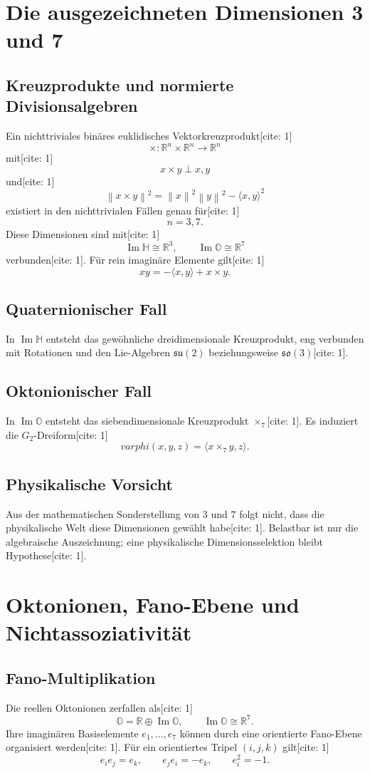 \documentclass[11pt,a4paper]{article}
\newcommand{\OO}{\mathbb{O}}
\newcommand{\HH}{\mathbb{H}}
\newcommand{\RR}{\mathbb{R}}
\newcommand{\norm}[1]{\left\lVert #1 \right\rVert}
\begin{document}
\section{Die ausgezeichneten Dimensionen 3 und 7}
\subsection{Kreuzprodukte und normierte Divisionsalgebren}
Ein nichttriviales binäres euklidisches Vektorkreuzprodukt[cite: 1]
\[
\times:\RR^n\times\RR^n\to\RR^n
\]
mit[cite: 1]
\[
x\times y\perp x,y
\]
und[cite: 1]
\[
\norm{x\times y}^2=\norm{x}^2\norm{y}^2-\langle x,y\rangle^2
\]
existiert in den nichttrivialen Fällen genau für[cite: 1]
\[
\boxed{n=3,7.}
\]
Diese Dimensionen sind mit[cite: 1]
\[
\operatorname{Im}\HH\cong\RR^3,\qquad \operatorname{Im}\OO\cong\RR^7
\]
verbunden[cite: 1]. Für rein imaginäre Elemente gilt[cite: 1]
\[
xy=-\langle x,y\rangle+x\times y.
\]

\subsection{Quaternionischer Fall}
In $\operatorname{Im}\HH$ entsteht das gewöhnliche dreidimensionale Kreuzprodukt, eng verbunden mit Rotationen und den Lie-Algebren $\mathfrak{su}(2)$ beziehungsweise $\mathfrak{so}(3)$[cite: 1].

\subsection{Oktonionischer Fall}
In $\operatorname{Im}\OO$ entsteht das siebendimensionale Kreuzprodukt $\times_7$[cite: 1]. Es induziert die $G_2$-Dreiform[cite: 1]
\[
varphi(x,y,z)=\langle x\times_7y,z\rangle.
\]

\subsection{Physikalische Vorsicht}
Aus der mathematischen Sonderstellung von $3$ und $7$ folgt nicht, dass die physikalische Welt diese Dimensionen gewählt habe[cite: 1]. Belastbar ist nur die algebraische Auszeichnung; eine physikalische Dimensionsselektion bleibt Hypothese[cite: 1].

\section{Oktonionen, Fano-Ebene und Nichtassoziativität}
\subsection{Fano-Multiplikation}
Die reellen Oktonionen zerfallen als[cite: 1]
\[
\OO=\RR\oplus\operatorname{Im}\OO,\qquad \operatorname{Im}\OO\cong\RR^7.
\]
Ihre imaginären Basiselemente $e_1,\dots,e_7$ können durch eine orientierte Fano-Ebene organisiert werden[cite: 1]. Für ein orientiertes Tripel $(i,j,k)$ gilt[cite: 1]
\[
e_ie_j=e_k,\qquad e_je_i=-e_k,\qquad e_i^2=-1.
\]
\end{document}
